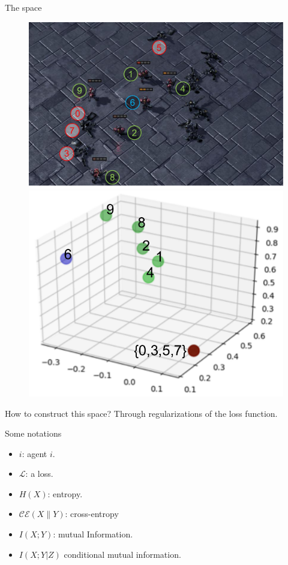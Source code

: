 \documentclass{beamer}
\begin{document}
    \begin{frame}{The space}
        \begin{figure}
            \includegraphics[height=0.35\linewidth]{img/10m_vs_11m-g4.pdf}\hfill
            \includegraphics[height=0.35\linewidth]{img/10m_vs_11m-r4.pdf}\hfill
        \end{figure}
        \pause
        \begin{block}{}
            How to construct this space? Through regularizations of the loss function.
        \end{block}
    \end{frame}

    \begin{frame}{Some notations}


        \begin{itemize}
            \item $i$: agent $i$.
            \item $\mathcal{L}$: a loss.
            \item $H(X)$: entropy.
            \item $\mathcal{CE}(X\|Y)$: cross-entropy
            \item $I(X;Y)$: mutual Information.
            \item $I(X;Y|Z)$ conditional mutual information.

        \end{itemize}

    \end{frame}
\end{document}
